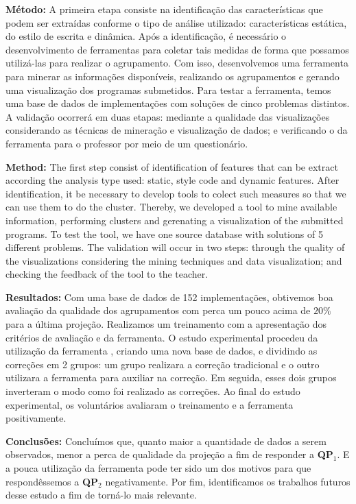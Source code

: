 \documentclass[12pt,english,brazil,a4paper,utf8,oneside]{utfpr-tcc}
\begin{document}
\begin{resumo}
\textbf{Método:} A primeira etapa consiste na identificação das características que
podem ser extraídas conforme o tipo de análise utilizado: características estática, do
estilo de escrita e dinâmica. Após a identificação, é necessário o desenvolvimento
de ferramentas para coletar tais medidas de forma que possamos utilizá-las para realizar
o agrupamento. Com isso, desenvolvemos uma ferramenta para minerar as informações
disponíveis, realizando os agrupamentos e gerando uma visualização dos programas submetidos.
Para testar a ferramenta, temos uma base de dados de implementações com soluções de cinco
problemas distintos. A validação ocorrerá em duas etapas: mediante a qualidade
das visualizações considerando as técnicas de mineração e visualização de dados; e
verificando o  da ferramenta para o professor por meio de um
questionário.

\textbf{Method:} The first step consist of identification of features that can be
extract according the analysis type used: static, style code and dynamic features.
After identification, it be necessary to develop tools to colect such measures so
that we can use them to do the cluster. Thereby, we developed a tool to mine available
information, performing clusters and gerenating a visualization of the submitted
programs. To test the tool, we have one source database with solutions of 5 different
problems. The validation will occur in two steps: through the quality of the visualizations
considering the mining techniques and data visualization; and checking the feedback
of the tool to the teacher.

\textbf{Resultados:} Com uma base de dados de 152 implementações, obtivemos boa
avaliação da qualidade dos agrupamentos com perca um pouco acima de $20\%$ para
a última projeção. Realizamos um treinamento com a apresentação dos critérios
de avaliação e da ferramenta. O estudo experimental procedeu da utilização da
ferramenta , criando uma nova base de dados, e dividindo
as correções em 2 grupos: um grupo realizara a correção tradicional e o outro
utilizara a ferramenta para auxiliar na correção. Em seguida, esses dois grupos
inverteram o modo como foi realizado as correções. Ao final do estudo experimental,
os voluntários avaliaram o treinamento e a ferramenta positivamente.

\textbf{Conclusões:} Concluímos que, quanto maior a quantidade de dados a serem
observados, menor a perca de qualidade da projeção a fim de responder a \textbf{QP$_1$}.
E a pouca utilização da ferramenta  pode ter sido um dos
motivos para que respondêssemos a \textbf{QP$_2$} negativamente. Por fim,
identificamos os trabalhos futuros desse estudo a fim de torná-lo mais relevante.


\end{resumo}
\end{document}
